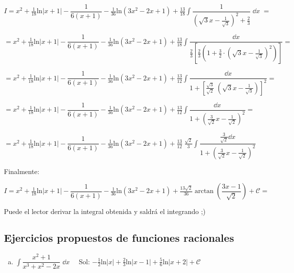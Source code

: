 {\begin{proofw}
 $I=\displaystyle x^2 + \frac {1}{18} \mathrm{ln}|x+1| - \dfrac {1}{6(x+1)}- \frac {1} {36}  \mathrm{ln} (3x^2-2x+1)+\frac {13} {18}  \int \dfrac {1}{(\sqrt{3}x -\frac {1}{\sqrt{3}} )^2 + \frac 2 3} \; \dd x \; =$
 
$=\displaystyle x^2 + \frac {1}{18} \mathrm{ln}|x+1| - \dfrac {1}{6(x+1)}- \frac {1} {36}  \mathrm{ln} (3x^2-2x+1)+\frac {13} {18}  \int \dfrac {\dd x}{ \frac 2 3 \left[ \frac 2 3 \left( 1+ \frac 3 2 \cdot \left(\sqrt{3}x-\frac {1}{\sqrt{3}}  \right)^2   \right) \right]} =$


 $=\displaystyle x^2 + \frac {1}{18} \mathrm{ln}|x+1| - \dfrac {1}{6(x+1)}- \frac {1} {36}  \mathrm{ln} (3x^2-2x+1)+\frac {13} {12}  \int \dfrac {\dd x}
 {1 + \left[  \frac {\sqrt{3}}{\sqrt{2}}\; \left ( \sqrt{3} x - \frac {1}{\sqrt{3}}     \right)  \right]^2} =$

 
 $=\displaystyle x^2 + \frac {1}{18} \mathrm{ln}|x+1| - \dfrac {1}{6(x+1)}- \frac {1} {36}  \mathrm{ln} (3x^2-2x+1)+\frac {13} {12}  \int \dfrac {\dd x}
 {1 +   \left ( \frac {3}{\sqrt{2}} x - \frac {1}{\sqrt{2}}     \right)^2} =$
 
  $=\displaystyle x^2 + \frac {1}{18} \mathrm{ln}|x+1| - \dfrac {1}{6(x+1)}- \frac {1} {36}  \mathrm{ln} (3x^2-2x+1)+\frac {13} {12}\; \frac {\sqrt{2}}{3}  \int \dfrac {\frac {3}{\sqrt {2}}\dd x}
 {1 +   \left ( \frac {3}{\sqrt{2}} x - \frac {1}{\sqrt{2}}     \right)^2} $
 
 Finalmente:


  $I=\displaystyle x^2 + \frac {1}{18} \mathrm{ln}|x+1| - \dfrac {1}{6(x+1)}- \frac {1} {36}  \mathrm{ln} (3x^2-2x+1)+\frac {13\sqrt{2}}{36} \arctan \left( \dfrac {3x-1}{\sqrt{2}}\right)+\mathcal C =$
  
  \textcolor{gris}{Puede el lector derivar la integral obtenida y saldrá el integrando ;)}

\end{proofw}


\subsection{Ejercicios propuestos de funciones racionales}

\begin{enumerate}[a) ]

\item $\displaystyle \int  \dfrac {x^2+1}{x^3+x^2-2x} \; \dd x \quad $ 
\textcolor{gris}{Sol: $-\frac 1 2 \mathrm{ln}|x|+\frac 2 3 \mathrm{ln}|x-1|+ \frac 5 6 \mathrm{ln}|x+2|   +\mathcal C$}


\end{enumerate}}
